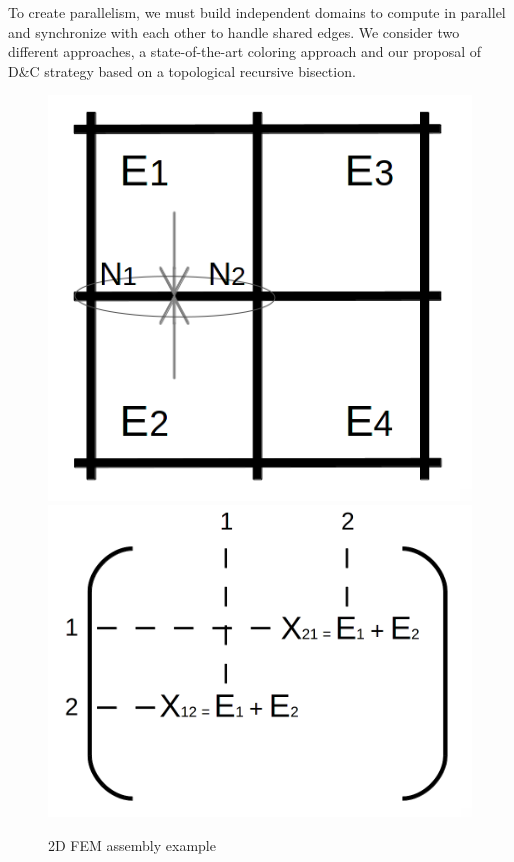 \documentclass{IOS-Book-Article}
\begin{document}
To create parallelism, we must build independent domains to compute in parallel and synchronize with each other to handle shared edges.
We consider two different approaches, a state-of-the-art coloring approach and our proposal of D\&C strategy based on a topological recursive bisection.
\begin{figure}[htp]
 \centering
 \includegraphics[scale=0.2]{2D_asm.png}
 \includegraphics[scale=0.12]{Matrix_asm.png}
 \caption{2D FEM assembly example}
 \label{fig:2Dasm}
\end{figure}
\end{document}
